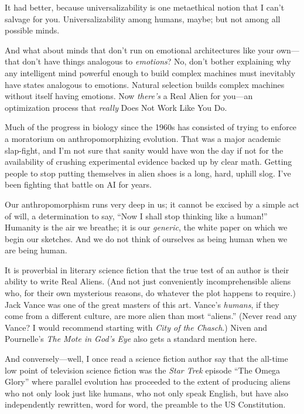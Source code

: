  It had better, because universalizability is one metaethical
notion that I can't salvage for you. Universalizability
among humans, maybe; but not among all possible minds.


 And what about minds that don't run on emotional
architectures like your own---that don't have things
analogous to \textit{emotions}? No, don't bother
explaining why any intelligent mind powerful enough to build complex
machines must inevitably have states analogous to emotions. Natural
selection builds complex machines without itself having emotions. Now
\textit{there's} a Real Alien for you---an optimization
process that \textit{really} Does Not Work Like You Do.


 Much of the progress in biology since the 1960s has consisted of
trying to enforce a moratorium on anthropomorphizing evolution. That
was a major academic slap-fight, and I'm not sure that
sanity would have won the day if not for the availability of crushing
experimental evidence backed up by clear math. Getting people to stop
putting themselves in alien shoes is a long, hard, uphill slog.
I've been fighting that battle on AI for years.


 Our anthropomorphism runs very deep in us; it cannot be excised by
a simple act of will, a determination to say, ``Now I
shall stop thinking like a human!'' Humanity is the
air we breathe; it is our \textit{generic}, the white paper on which we
begin our sketches. And we do not think of ourselves as being human
when we are being human.

{
 It is proverbial in literary science fiction that the true test of
an author is their ability to write Real Aliens. (And not just
conveniently incomprehensible aliens who, for their own mysterious
reasons, do whatever the plot happens to require.) Jack Vance was one
of the great masters of this art. Vance's
\textit{humans}, if they come from a different culture, are more alien
than most ``aliens.'' (Never read
any Vance? I would recommend starting with \textit{City of the
Chasch}.) Niven and Pournelle's \textit{The Mote in
God's Eye} also gets a standard mention here.}


 And conversely---well, I once read a science fiction author say that the all-time low point of television
science fiction was the \textit{Star Trek} episode ``The Omega Glory'' where parallel
evolution has proceeded to the extent of producing aliens who not only
look just like humans, who not only speak English, but have also
independently rewritten, word for word, the preamble to the US
Constitution.


